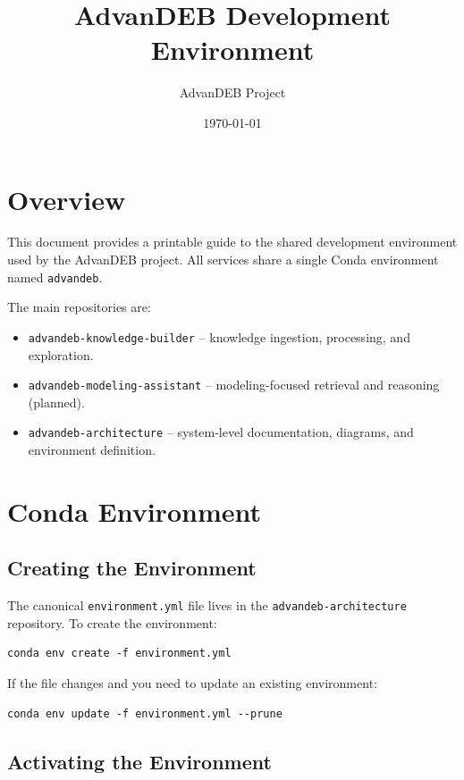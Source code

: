 \documentclass[11pt]{article}
\title{AdvanDEB Development Environment}
\author{AdvanDEB Project}
\date{\today}
\begin{document}
\maketitle

\section{Overview}

This document provides a printable guide to the shared development environment used by the AdvanDEB project. All services share a single Conda environment named \texttt{advandeb}.

The main repositories are:

\begin{itemize}[noitemsep]
  \item \texttt{advandeb-knowledge-builder} -- knowledge ingestion, processing, and exploration.
  \item \texttt{advandeb-modeling-assistant} -- modeling-focused retrieval and reasoning (planned).
  \item \texttt{advandeb-architecture} -- system-level documentation, diagrams, and environment definition.
\end{itemize}

\section{Conda Environment}

\subsection{Creating the Environment}

The canonical \texttt{environment.yml} file lives in the \texttt{advandeb-architecture} repository. To create the environment:

\begin{verbatim}
conda env create -f environment.yml
\end{verbatim}

If the file changes and you need to update an existing environment:

\begin{verbatim}
conda env update -f environment.yml --prune
\end{verbatim}

\subsection{Activating the Environment}
\end{document}

